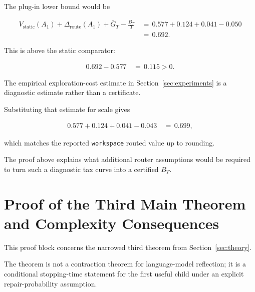 \documentclass{article} %
\begin{document}
The plug-in lower bound would be

\begin{align}
\label{eq:app-workspace-plugin-arithmetic}
V_{\mathrm{static}}(A_1)
+
\Delta_{\mathrm{route}}(A_1)
+
\bar G_T
-
\frac{B_T}{T}
&\,=\,
0.577+0.124+0.041-0.050
\\
&\,=\,
0.692.
\end{align}

This is above the static comparator:

\begin{align}
\label{eq:app-workspace-margin}
0.692-0.577
&\,=\,
0.115
>
0.
\end{align}

The empirical exploration-cost estimate in Section~\ref{sec:experiments} is a diagnostic estimate rather than a certificate.

Substituting that estimate for scale gives

\begin{align}
\label{eq:app-workspace-empirical-tax-arithmetic}
0.577+0.124+0.041-0.043
&\,=\,
0.699,
\end{align}

which matches the reported \texttt{workspace} routed value up to rounding.

The proof above explains what additional router assumptions would be required to turn such a diagnostic tax curve into a certified \(B_T\).

\section{Proof of the Third Main Theorem and Complexity Consequences}

\label{app:proofs3}

This proof block concerns the narrowed third theorem from Section~\ref{sec:theory}.

The theorem is not a contraction theorem for language-model reflection; it is a conditional stopping-time statement for the first useful child under an explicit repair-probability assumption.
\end{document}
